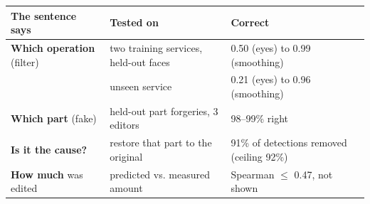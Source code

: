 \documentclass[border=4pt]{standalone}
\begin{document}
\Large
\begin{tabular}{lll}
\toprule
The sentence says & Tested on & Correct \\
\midrule
\textbf{Which operation} (filter) & two training services, held-out faces & 0.50 (eyes) to 0.99 (smoothing) \\[2pt]
 & unseen service & \cellcolor{fail}0.21 (eyes) to 0.96 (smoothing) \\[2pt]
\textbf{Which part} (fake) & held-out part forgeries, 3 editors & \cellcolor{pass}98--99\% right \\[2pt]
\textbf{Is it the cause?} & restore that part to the original & \cellcolor{pass}91\% of detections removed (ceiling 92\%) \\[2pt]
\textbf{How much} was edited & predicted vs. measured amount & \cellcolor{fail}Spearman $\le$ 0.47, not shown \\[2pt]
\bottomrule
\end{tabular}
\end{document}
